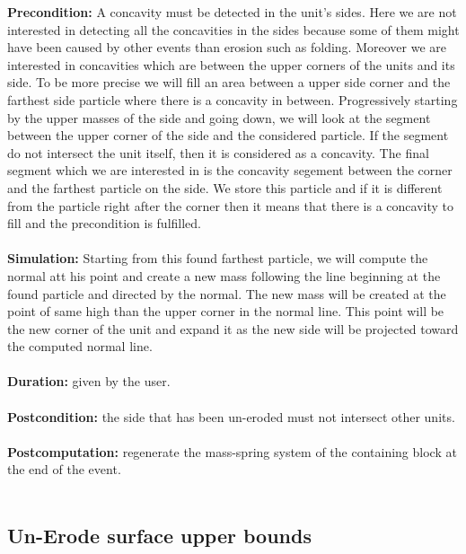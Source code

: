 \documentclass[12pt, a4paper]{memoir} %
\begin{document}
\textbf{Precondition:} A concavity must be detected in the unit's sides. Here we are not interested in detecting all the concavities in the sides because some of them might have been caused by other events than erosion such as folding. Moreover we are interested in concavities which are between the upper corners of the units and its side. To be more precise we will fill an area between a upper side corner and the farthest side particle where there is a concavity in between. Progressively starting by the upper masses of the side and going down, we will look at the segment between the upper corner of the side and the considered particle. If the segment do not intersect the unit itself, then it is considered as a concavity. The final segment which we are interested in is the concavity segement between the corner and the farthest particle on the side. We store this particle and if it is different from the particle right after the corner then it means that there is a concavity to fill and the precondition is fulfilled.\\\\
\textbf{Simulation:}  Starting from this found farthest particle, we will compute the normal att his point and create a new mass following the line beginning at the found particle and directed by the normal. The new mass will be created at the point of same high than the upper corner in the normal line. This point will be the new corner of the unit and expand it as the new side will be projected toward the computed normal line.\\\\
\textbf{Duration:} given by the user.\\\\
\textbf{Postcondition:} the side that has been un-eroded must not intersect other units.\\\\
\textbf{Postcomputation:} regenerate the mass-spring system of the containing block at the end of the event.\\\\

\subsection{Un-Erode surface upper bounds}
\end{document}
